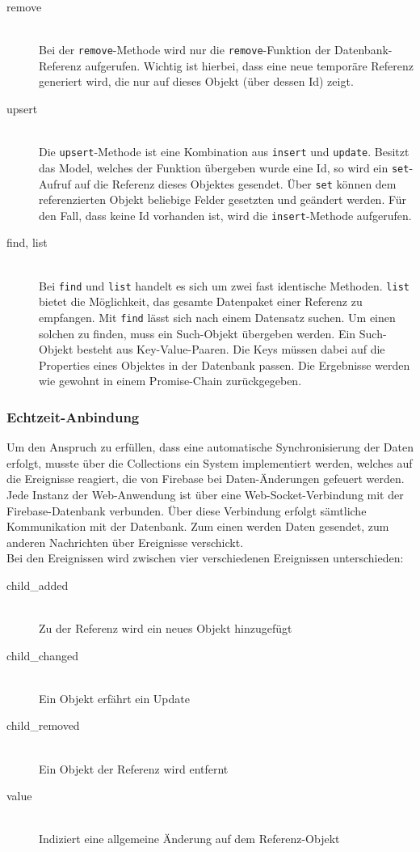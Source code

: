\begin{description}
\item[remove]\hfill \\
Bei der \texttt{remove}-Methode wird nur die \texttt{remove}-Funktion der Datenbank-Referenz aufgerufen. Wichtig ist hierbei, dass eine neue temporäre Referenz generiert wird, die nur
auf dieses Objekt (über dessen Id) zeigt.

\item[upsert]\hfill \\
Die \texttt{upsert}-Methode ist eine Kombination aus \texttt{insert} und \texttt{update}. Besitzt das Model, welches der Funktion übergeben wurde eine Id, so wird ein \texttt{set}-Aufruf auf die Referenz dieses Objektes gesendet. Über \texttt{set} können dem referenzierten Objekt beliebige Felder gesetzten und geändert werden. Für den Fall, dass keine Id vorhanden ist, wird die \texttt{insert}-Methode aufgerufen.

\item[find, list]\hfill \\
Bei \texttt{find} und \texttt{list} handelt es sich um zwei fast identische Methoden. \texttt{list} bietet die Möglichkeit, das gesamte Datenpaket einer Referenz zu empfangen. Mit \texttt{find} lässt sich nach einem Datensatz suchen. Um einen solchen zu finden, muss ein Such-Objekt übergeben werden. Ein Such-Objekt besteht aus Key-Value-Paaren. Die Keys müssen dabei auf die Properties eines Objektes in der Datenbank passen. Die Ergebnisse werden wie gewohnt in einem Promise-Chain zurückgegeben.

\end{description}

\subsubsection{Echtzeit-Anbindung}
Um den Anspruch zu erfüllen, dass eine automatische Synchronisierung der Daten erfolgt, musste über die Collections ein System implementiert werden, welches auf die Ereignisse reagiert, die von Firebase bei Daten-Änderungen gefeuert werden.\\
Jede Instanz der Web-Anwendung ist über eine Web-Socket-Verbindung mit der Firebase-Datenbank verbunden. Über diese Verbindung erfolgt sämtliche Kommunikation mit der Datenbank. Zum einen werden Daten gesendet, zum anderen Nachrichten über Ereignisse verschickt.\\
Bei den Ereignissen wird zwischen vier verschiedenen Ereignissen unterschieden:
\begin{description}
\item[child\_added]\hfill \\
Zu der Referenz wird ein neues Objekt hinzugefügt
\item[child\_changed]\hfill \\
Ein Objekt erfährt ein Update
\item[child\_removed]\hfill \\
Ein Objekt der Referenz wird entfernt
\item[value]\hfill \\
Indiziert eine allgemeine Änderung auf dem Referenz-Objekt
\end{description}

